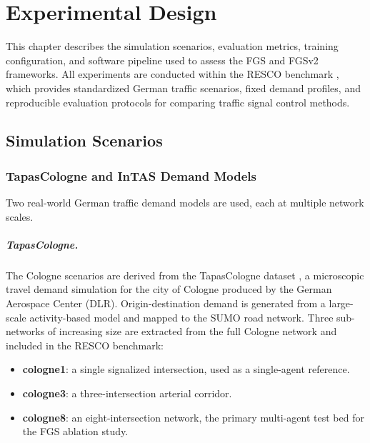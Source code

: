 \chapter{Experimental Design}
\label{ch:ExperimentalDesign}

This chapter describes the simulation scenarios, evaluation metrics, training configuration, and software pipeline used to assess the FGS and FGSv2 frameworks. All experiments are conducted within the RESCO benchmark \citep{ault2021reinforcement}, which provides standardized German traffic scenarios, fixed demand profiles, and reproducible evaluation protocols for comparing traffic signal control methods.

\section{Simulation Scenarios}
\label{sec:ExperimentalDesign_DatasetMaterialsSystemContext}

\subsection{TapasCologne and InTAS Demand Models}
\label{sec:ExperimentalDesign_TapasCologneInTAS}

Two real-world German traffic demand models are used, each at multiple network scales.

\paragraph{TapasCologne.}
The Cologne scenarios are derived from the TapasCologne dataset \citep{tapascologne}, a microscopic travel demand simulation for the city of Cologne produced by the German Aerospace Center (DLR). Origin-destination demand is generated from a large-scale activity-based model and mapped to the SUMO road network. Three sub-networks of increasing size are extracted from the full Cologne network and included in the RESCO benchmark:
\begin{itemize}
  \item \textbf{cologne1}: a single signalized intersection, used as a single-agent reference.
  \item \textbf{cologne3}: a three-intersection arterial corridor.
  \item \textbf{cologne8}: an eight-intersection network, the primary multi-agent test bed for the FGS ablation study.
\end{itemize}

